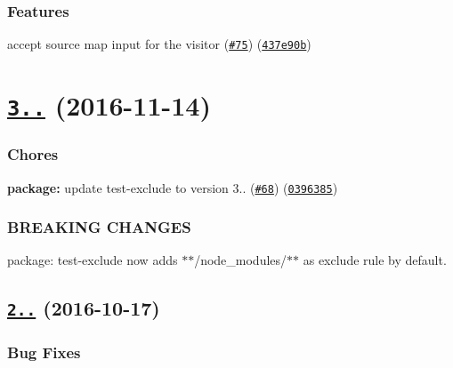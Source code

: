 \subsubsection*{Features}


\begin{DoxyItemize}
\item accept source map input for the visitor (\href{https://github.com/istanbuljs/babel-plugin-istanbul/issues/75}{\tt \#75}) (\href{https://github.com/istanbuljs/babel-plugin-istanbul/commit/437e90b}{\tt 437e90b})
\end{DoxyItemize}

\label{_3.0.0}%
 \section*{\href{https://github.com/istanbuljs/babel-plugin-istanbul/compare/v2.0.3...v3.0.0}{\tt 3..} (2016-\/11-\/14)}

\subsubsection*{Chores}


\begin{DoxyItemize}
\item {\bfseries package\+:} update test-\/exclude to version 3.. (\href{https://github.com/istanbuljs/babel-plugin-istanbul/issues/68}{\tt \#68}) (\href{https://github.com/istanbuljs/babel-plugin-istanbul/commit/0396385}{\tt 0396385})
\end{DoxyItemize}

\subsubsection*{B\+R\+E\+A\+K\+I\+NG C\+H\+A\+N\+G\+ES}


\begin{DoxyItemize}
\item package\+: test-\/exclude now adds {\ttfamily $\ast$$\ast$/node\+\_\+modules/$\ast$$\ast$} as exclude rule by default.
\end{DoxyItemize}

\label{_2.0.3}%
 \subsection*{\href{https://github.com/istanbuljs/babel-plugin-istanbul/compare/v2.0.2...v2.0.3}{\tt 2..} (2016-\/10-\/17)}

\subsubsection*{Bug Fixes}


